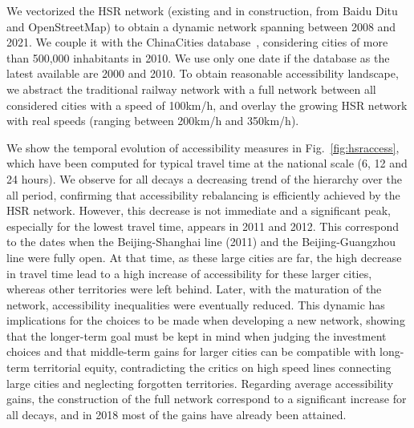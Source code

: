 \documentclass[11pt]{article}
\begin{document}
We vectorized the HSR network (existing and in construction, from Baidu Ditu and OpenStreetMap) to obtain a dynamic network spanning between 2008 and 2021. We couple it with the ChinaCities database~\citep{swerts2017database}, considering cities of more than 500,000 inhabitants in 2010. We use only one date if the database as the latest available are 2000 and 2010. To obtain reasonable accessibility landscape, we abstract the traditional railway network with a full network between all considered cities with a speed of 100km/h, and overlay the growing HSR network with real speeds (ranging between 200km/h and 350km/h).

We show the temporal evolution of accessibility measures in Fig.~\ref{fig:hsraccess}, which have been computed for typical travel time at the national scale (6, 12 and 24 hours). We observe for all decays a decreasing trend of the hierarchy over the all period, confirming that accessibility rebalancing is efficiently achieved by the HSR network. However, this decrease is not immediate and a significant peak, especially for the lowest travel time, appears in 2011 and 2012. This correspond to the dates when the Beijing-Shanghai line (2011) and the Beijing-Guangzhou line were fully open. At that time, as these large cities are far, the high decrease in travel time lead to a high increase of accessibility for these larger cities, whereas other territories were left behind. Later, with the maturation of the network, accessibility inequalities were eventually reduced. This dynamic has implications for the choices to be made when developing a new network, showing that the longer-term goal must be kept in mind when judging the investment choices and that middle-term gains for larger cities can be compatible with long-term territorial equity, contradicting the critics on high speed lines connecting large cities and neglecting forgotten territories. Regarding average accessibility gains, the construction of the full network correspond to a significant increase for all decays, and in 2018 most of the gains have already been attained.
\end{document}
